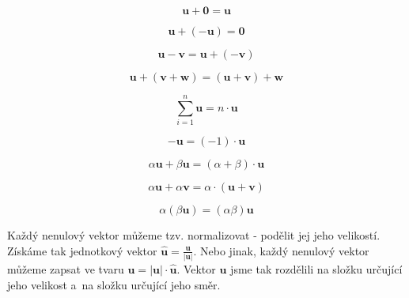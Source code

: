 \documentclass{book}
\newcommand{\vect}[1]{\boldsymbol{#1}}
\newcommand{\unitvect}[1]{\hat{\boldsymbol{#1}}}
\begin{document}
\begin{fact}
\begin{equation}
\label{eq:euklidovsky_prostor_definice_nuloveho_vektoru}
\vect{u} + \vect{0} = \vect{u}
\end{equation}

\begin{equation}
\label{eq:euklidovsky_prostor_definice_opacneho_vektoru}
\vect{u} + (-\vect{u}) = \vect{0}
\end{equation}

\begin{equation}
\label{eq:euklidovsky_prostor_definice_odecitani_vektoru}
\vect{u} - \vect{v} = \vect{u} + (-\vect{v})
\end{equation}

\begin{equation}
\label{eq:euklidovsky_prostor_vektor_asociativita_scitani}
\vect{u} + (\vect{v} + \vect{w}) = (\vect{u} + \vect{v}) + \vect{w}
\end{equation}

\begin{equation}
\label{eq:euklidovsky_prostor_definice_nasobeni}
\sum_{i=1}^n \vect{u} = n \cdot \vect{u}
\end{equation}

\begin{equation}
\label{eq:euklidovsky_prostor_vektor_opacny}
-\vect{u} = (-1) \cdot \vect{u}
\end{equation}

\begin{equation}
\label{eq:euklidovsky_prostor_vektor_distribuce_scitani}
\alpha \vect{u} + \beta \vect{u} = (\alpha + \beta) \cdot \vect{u}
\end{equation}

\begin{equation}
\label{eq:euklidovsky_prostor_vektor_distribuce_nasobeni}
\alpha \vect{u} + \alpha \vect{v} = \alpha \cdot (\vect{u} + \vect{v})
\end{equation}

\begin{equation}
\label{eq:euklidovsky_prostor_asociativita_nasobeni}
\alpha (\beta \vect{u}) = (\alpha \beta) \vect{u}
\end{equation}
\end{fact}

Každý nenulový vektor můžeme tzv. normalizovat - podělit jej jeho velikostí. Získáme tak jednotkový vektor \(\unitvect{u} = \frac{\vect{u}}{|\vect{u}|}\). Nebo jinak, každý nenulový vektor můžeme zapsat ve tvaru \(\vect{u} = |\vect{u}| \cdot \unitvect{u}\). Vektor \(\vect{u}\) jsme tak rozdělili na složku určující jeho velikost a~na složku určující jeho směr.
\end{document}
